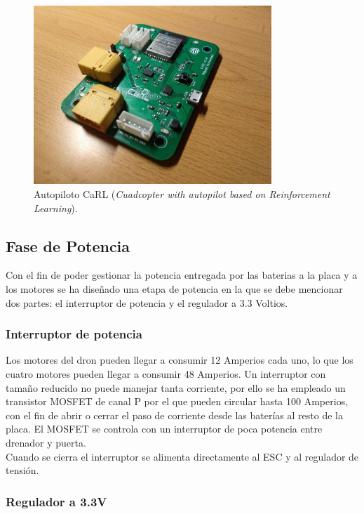 \begin{figure}[htb!]
	\centering
	\includegraphics[width=0.8\textwidth]{hardware/carl_board}
	\caption{Autopiloto CaRL (\textit{Cuadcopter with autopilot based on Reinforcement Learning}).}
	\label{hardware:carl_board}	
\end{figure}



\subsection{Fase de Potencia}

Con el fin de poder gestionar la potencia entregada por las baterias a la placa y a los motores se ha diseñado una etapa de potencia en la que se debe mencionar dos partes: el interruptor de potencia y el regulador a 3.3 Voltios.

\subsubsection{Interruptor de potencia}

Los motores del dron pueden llegar a consumir 12 Amperios cada uno, lo que los cuatro motores pueden llegar a consumir 48 Amperios. Un interruptor con tamaño reducido no puede manejar tanta corriente, por ello se ha empleado un transistor MOSFET de canal P por el que pueden circular hasta 100 Amperios, con el fin de abrir o cerrar el paso de corriente desde las baterías al resto de la placa. El MOSFET se controla con un interruptor de poca potencia entre drenador y puerta.\\

Cuando se cierra el interruptor se alimenta directamente al ESC y al regulador de tensión.


\subsubsection{Regulador a 3.3V}

